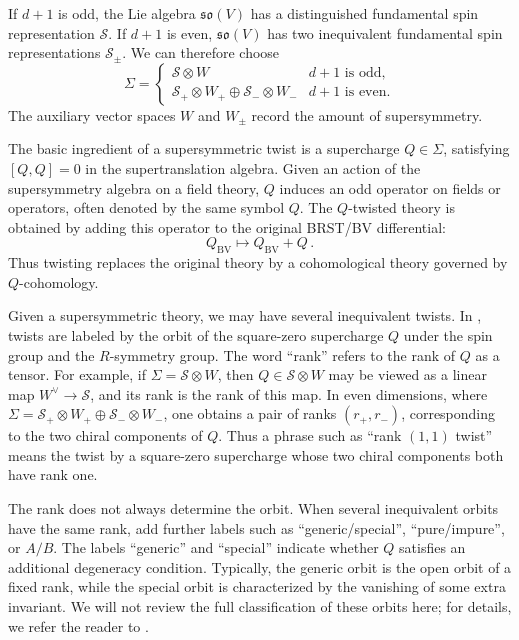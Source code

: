 \documentclass[11pt]{article}
\numberwithin{equation}{section}
\begin{document}
If $d+1$ is odd, the Lie algebra $\mathfrak{so}(V)$ has a distinguished fundamental spin representation $\mathcal{S}$. If $d+1$ is even, $\mathfrak{so}(V)$ has two inequivalent fundamental spin representations $\mathcal{S}_{\pm}$. We can therefore choose
\begin{equation}
	\Sigma = \begin{cases}
		\mathcal{S}\otimes W & d+1 \text{ is odd,}\\
		\mathcal{S}_+ \otimes W_+\oplus \mathcal{S}_- \otimes W_- & d+1 \text{ is even.}
	\end{cases}
\end{equation}
The auxiliary vector spaces \(W\) and \(W_\pm\) record the amount of supersymmetry. 


The basic ingredient of a supersymmetric twist is a supercharge \(Q \in \Sigma\), satisfying  \([Q,Q]=0\) in the supertranslation algebra. Given an action of the supersymmetry algebra on a field theory, \(Q\) induces an odd operator on fields or operators, often denoted by the same symbol \(Q\). The \(Q\)-twisted theory is obtained by adding this operator to the original BRST/BV differential:
\[
    Q_{\mathrm{BV}} \longmapsto Q_{\mathrm{BV}}+Q\,.
\]
Thus twisting replaces the original theory by a cohomological theory governed by \(Q\)-cohomology. 

Given a supersymmetric theory, we may have several inequivalent twists. In \cite{Elliott:2020ecf}, twists are labeled by the orbit of the square-zero supercharge \(Q\) under the spin group and the \(R\)-symmetry group. The word ``rank'' refers to the rank of \(Q\) as a tensor. For example, if $\Sigma = \mathcal S\otimes W$, then \(Q\in \mathcal S\otimes W\) may be viewed as a linear map $W^\vee \to \mathcal S$, and its rank is the rank of this map. In even dimensions, where $\Sigma = \mathcal S_+\otimes W_+ \oplus \mathcal S_-\otimes W_-$, one obtains a pair of ranks \((r_+,r_-)\), corresponding to the two chiral components of \(Q\). Thus a phrase such as ``rank \((1,1)\) twist'' means the twist by a square-zero supercharge whose two chiral components both have rank one.

The rank does not always determine the orbit. When several inequivalent orbits have the same rank, \cite{Elliott:2020ecf} add further labels such as ``generic/special'', ``pure/impure'', or \(A/B\). The labels ``generic'' and ``special'' indicate whether \(Q\) satisfies an additional degeneracy condition. Typically, the generic orbit is the open orbit of a fixed rank, while the special orbit is characterized by the
vanishing of some extra invariant. We will not review the full classification of these orbits here; for details, we refer the reader to \cite{Elliott:2020ecf}.
\end{document}
